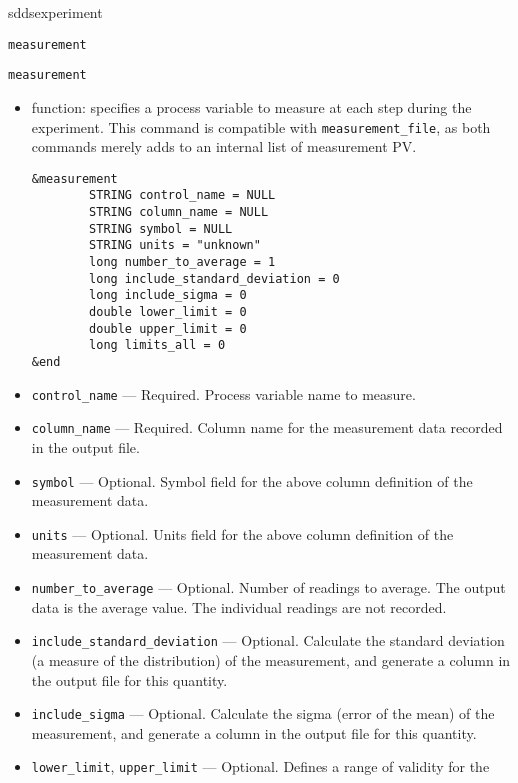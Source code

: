 \begin{sddsprog}{sddsexperiment}
\begin{itemize}
\begin{latexonly}
\newpage\begin{center}{\Large \verb+measurement+}\end{center}
\end{latexonly}
\begin{htmlonly}
\item {\Large \verb+measurement+}
\end{htmlonly}
\begin{itemize}
        \item function: specifies a process variable to measure at each step during the experiment.
                This command is compatible with {\verb+measurement_file+}, as both commands
                merely adds to an internal list of measurement PV.
\begin{verbatim}
&measurement
        STRING control_name = NULL
        STRING column_name = NULL
        STRING symbol = NULL
        STRING units = "unknown"
        long number_to_average = 1
        long include_standard_deviation = 0
        long include_sigma = 0
        double lower_limit = 0
        double upper_limit = 0
        long limits_all = 0
&end
\end{verbatim}
        \item {\verb+control_name+} --- Required. Process variable name to measure.
        \item {\verb+column_name+} --- Required. Column name for the measurement data recorded in the output file.
        \item {\verb+symbol+} --- Optional. Symbol field for the above column definition of the measurement data.
        \item {\verb+units+} --- Optional. Units field for the above column definition of the measurement data.
        \item {\verb+number_to_average+} --- Optional. Number of readings to average. The output data
                is the average value. The individual readings are not recorded.
        \item {\verb+include_standard_deviation+} ---  Optional. Calculate the standard deviation 
                (a measure of the distribution) of the
                measurement, and generate a column in the output file for this quantity.
        \item {\verb+include_sigma+} ---  Optional. Calculate the sigma (error of the mean) of the
                measurement, and generate a column in the output file for this quantity.
        \item {\verb+lower_limit+}, {\verb+upper_limit+} --- Optional. Defines a range of validity for the

\end{itemize}
\end{itemize}
\end{sddsprog}

